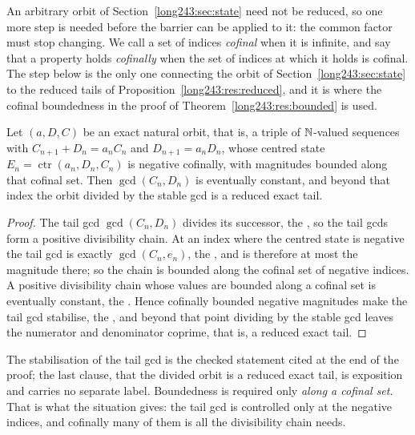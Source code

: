 \documentclass[11pt]{article}
\newcommand{\ctr}{\operatorname{ctr}}
\begin{document}
An arbitrary orbit of Section~\ref{long243:sec:state} need not be reduced, so one more step is needed
before the barrier can be applied to it: the common factor must stop changing.
We call a set of indices \emph{cofinal} when it is infinite, and say that a
property holds \emph{cofinally} when the set of indices at which it holds is
cofinal.  The step below is the only one connecting the orbit of
Section~\ref{long243:sec:state} to the reduced tails of
Proposition~\ref{long243:res:reduced}, and it is where the cofinal boundedness in the
proof of Theorem~\ref{long243:res:bounded} is used.

\begin{proposition}\label{long243:res:gcdstab}
Let $(a,D,C)$ be an exact natural orbit, that is, a triple of $\mathbb{N}$-valued
sequences with $C_{n+1}+D_n=a_nC_n$ and $D_{n+1}=a_nD_n$, whose centred state
$E_n=\ctr(a_n,D_n,C_n)$ is negative cofinally, with magnitudes bounded along
that cofinal set.  Then
$\gcd(C_n,D_n)$ is eventually constant, and beyond that index the orbit divided
by the stable gcd is a reduced exact tail.
\end{proposition}

\begin{proof}
The tail gcd $\gcd(C_n,D_n)$ divides its successor, the
, so the tail gcds form a positive divisibility chain.  At an
index where the centred state is negative the tail gcd is exactly
$\gcd(C_n,e_n)$, the
, and is therefore at most the magnitude there; so the
chain is bounded along the cofinal set of negative indices.  A positive
divisibility chain whose values are bounded along a cofinal set is eventually
constant, the
.  Hence cofinally bounded negative magnitudes make the tail gcd
stabilise, the
, and beyond that point dividing by the stable gcd leaves the
numerator and denominator coprime, that is, a reduced exact tail.
\end{proof}

\noindent The stabilisation of the tail gcd is the checked statement cited at
the end of the proof; the last clause, that the divided orbit is a reduced
exact tail, is exposition and carries no separate label.  Boundedness is
required only \emph{along a cofinal set}.  That is what the situation gives:
the tail gcd is
controlled only at the negative indices, and cofinally many of them is all the
divisibility chain needs.
\end{document}
